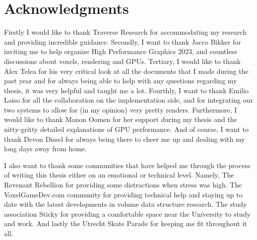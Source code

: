 \section*{Acknowledgments} \label{acknowledgments}

Firstly I would like to thank Traverse Research for accommodating my research and providing incredible guidance. Secondly, I want to thank Jacco Bikker for inviting me to help organize High Performance Graphics 2023, and countless discussions about voxels, rendering and GPUs. Tertiary, I would like to thank Alex Telea for his very critical look at all the documents that I made during the past year and for always being able to help with any questions regarding my thesis, it was very helpful and taught me a lot. Fourthly, I want to thank Emilio Laiso for all the collaboration on the implementation side, and for integrating our two systems to allow for (in my opinion) very pretty renders. Furthermore, I would like to thank Manon Oomen for her support during my thesis and the nitty-gritty detailed explanations of GPU performance. And of course, I want to thank Devon Dissel for always being there to cheer me up and dealing with my long days away from home.

I also want to thank some communities that have helped me through the process of writing this thesis either on an emotional or technical level. Namely, The Revenant Rebellion for providing some distractions when stress was high. The VoxelGameDev.com community for providing technical help and staying up to date with the latest developments in volume data structure research. The study association Sticky for providing a comfortable space near the University to study and work. And lastly the Utrecht Skate Parade for keeping me fit throughout it all.